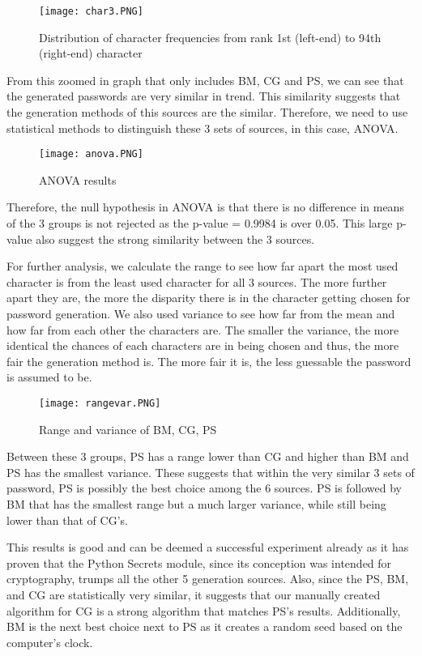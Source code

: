 \documentclass[letterpaper,twocolumn,10pt]{article}
\begin{document}
\begin{figure}[H]
    \centering
    \texttt{[image: char3.PNG]}
    \caption{Distribution of character frequencies from rank 1st (left-end) to 94th (right-end) character}
\end{figure}

From this zoomed in graph that only includes BM, CG and PS, we can see that the generated passwords are very similar in trend. This similarity suggests that the generation methods of this sources are the similar. Therefore, we need to use statistical methods to distinguish these 3 sets of sources, in this case, ANOVA.

\begin{figure}[H]
    \centering
    \texttt{[image: anova.PNG]}
    \caption{ANOVA results}
\end{figure}

Therefore, the null hypothesis in ANOVA is that there is no difference in means of the 3 groups is not rejected as the p-value = 0.9984 is over 0.05. This large p-value also suggest the strong similarity between the 3 sources. 

For further analysis, we calculate the range to see how far apart the most used character is from the least used character for all 3 sources. The more further apart they are, the more the disparity there is in the character getting chosen for password generation. We also used variance to see how far from the mean and how far from each other the characters are. The smaller the variance, the more identical the chances of each characters are in being chosen and thus, the more fair the generation method is. The more fair it is, the less guessable the password is assumed to be.

\begin{figure}[H]
    \centering
    \texttt{[image: rangevar.PNG]}
    \caption{Range and variance of BM, CG, PS}
\end{figure}

Between these 3 groups, PS has a range lower than CG and higher than BM and PS has the smallest variance. These suggests that within the very similar 3 sets of password, PS is possibly the best choice among the 6 sources. PS is followed by BM that has the smallest range but a much larger variance, while still being lower than that of CG's. 

This results is good and can be deemed a successful experiment already as it has proven that the Python Secrets module, since its conception was intended for cryptography, trumps all the other 5 generation sources. Also, since the PS, BM, and CG are statistically very similar, it suggests that our manually created algorithm for CG is a strong algorithm that matches PS's results. Additionally, BM is the next best choice next to PS as it creates a random seed based on the computer's clock.
\end{document}
